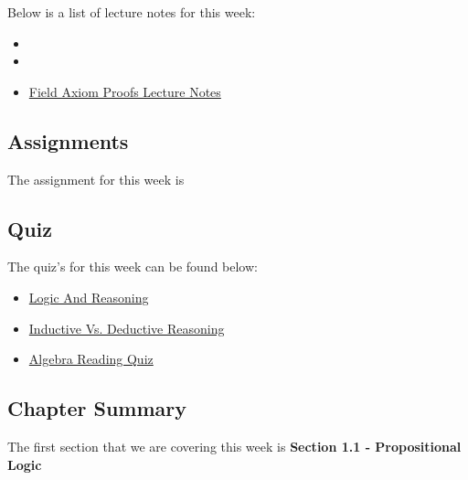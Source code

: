 \noindent Below is a list of lecture notes for this week:

\begin{itemize}
    \item {}
    \item {}
    \item \href{https://www.stumblingrobot.com/2015/06/29/prove-consequences-of-the-field-axioms/}{Field Axiom Proofs Lecture Notes}
\end{itemize}

\subsection{Assignments}

The assignment for this week is   

\subsection{Quiz}

The quiz's for this week can be found below:

\begin{itemize}
    \item \href{https://applied.cs.colorado.edu/mod/quiz/view.php?id=51560}{Logic And Reasoning} \textbullet {}  
    \item \href{https://www.dictionary.com/games/quizzes/is-it-inductive-or-deductive-a-reasoning-challenge}{Inductive Vs. Deductive Reasoning}  
    \item \href{https://applied.cs.colorado.edu/mod/quiz/view.php?id=51556}{Algebra Reading Quiz}  
\end{itemize}

\subsection{Chapter Summary}

The first section that we are covering this week is \textbf{Section 1.1 - Propositional Logic}

